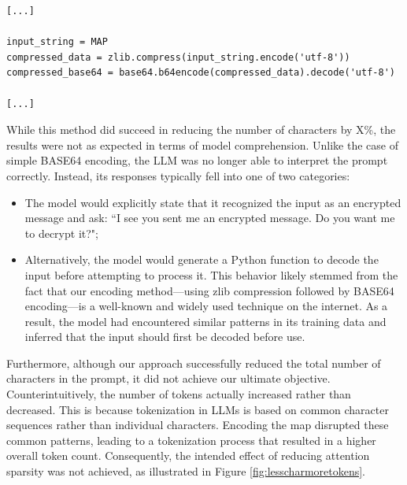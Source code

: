 \vspace{10mm}
\begin{codewindow}
    \begin{lstlisting}
[...]

input_string = MAP
compressed_data = zlib.compress(input_string.encode('utf-8'))
compressed_base64 = base64.b64encode(compressed_data).decode('utf-8')

[...]
\end{lstlisting}
\end{codewindow}
\vspace{10mm}

While this method did succeed in reducing the number of characters by X\%, the
results were not as expected in terms of model comprehension. Unlike the case of
simple BASE64 encoding, the LLM was no longer able to interpret the prompt
correctly. Instead, its responses typically fell into one of two categories:
\begin{itemize}
  \item The model would explicitly state that it recognized the input as an encrypted
    message and ask: ``I see you sent me an encrypted message. Do you want me to
    decrypt it?";

  \item Alternatively, the model would generate a Python function to decode the
    input before attempting to process it. This behavior likely stemmed from the
    fact that our encoding method—using zlib compression followed by BASE64 encoding—is
    a well-known and widely used technique on the internet. As a result, the model
    had encountered similar patterns in its training data and inferred that the input
    should first be decoded before use.
\end{itemize}

Furthermore, although our approach successfully reduced the total number of characters
in the prompt, it did not achieve our ultimate objective. Counterintuitively,
the number of tokens actually increased rather than decreased. This is because tokenization
in LLMs is based on common character sequences rather than individual characters.
Encoding the map disrupted these common patterns, leading to a tokenization process
that resulted in a higher overall token count. Consequently, the intended effect
of reducing attention sparsity was not achieved, as illustrated in Figure
\ref{fig:lesscharmoretokens}.


